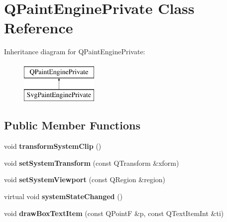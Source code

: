 \hypertarget{class_q_paint_engine_private}{}\section{Q\+Paint\+Engine\+Private Class Reference}
\label{class_q_paint_engine_private}
Inheritance diagram for Q\+Paint\+Engine\+Private\+:\begin{figure}[H]
\begin{center}
\leavevmode
\includegraphics[height=2.000000cm]{class_q_paint_engine_private}
\end{center}
\end{figure}
\subsection*{Public Member Functions}
\begin{DoxyCompactItemize}
\item 
\mbox{\label{class_q_paint_engine_private_a917bfa6bc042022893491f04cc8c7f85}} 
void {\bfseries transform\+System\+Clip} ()
\item 
\mbox{\label{class_q_paint_engine_private_a2f29774ba4bb1afdd22e5fc6083da581}} 
void {\bfseries set\+System\+Transform} (const Q\+Transform \&xform)
\item 
\mbox{\label{class_q_paint_engine_private_a02bc07cbe60f7eeaa433b74bee8cd4e3}} 
void {\bfseries set\+System\+Viewport} (const Q\+Region \&region)
\item 
\mbox{\label{class_q_paint_engine_private_a97c43975b009cc34a0cc1a2f47ae8118}} 
virtual void {\bfseries system\+State\+Changed} ()
\item 
\mbox{\label{class_q_paint_engine_private_af6543b721e3b610abcb60e73b7318919}} 
void {\bfseries draw\+Box\+Text\+Item} (const Q\+PointF \&p, const Q\+Text\+Item\+Int \&ti)
\end{DoxyCompactItemize}
